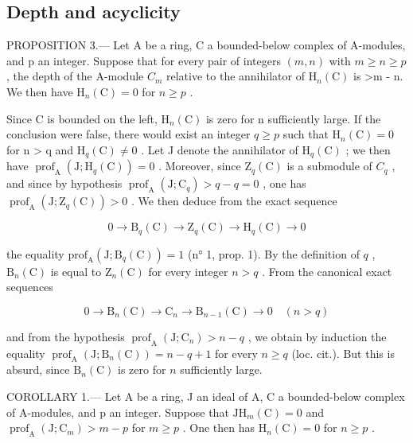 \subsection{Depth and acyclicity}

PROPOSITION 3.--- Let A be a ring, C a bounded-below complex of A-modules, and p an integer. Suppose that for every pair of integers \((m,n)\) with \(m \geqslant n \geqslant p\) , the depth of the A-module \(C_{m}\) relative to the annihilator of \(\mathrm{H}_{n}(\mathrm{C})\) is \textgreater m - n. We then have \(\mathrm{H}_{n}(\mathrm{C}) = 0\) for \(n \geqslant p\) .

Since C is bounded on the left, \(\mathrm{H}_{n}(\mathrm{C})\) is zero for n sufficiently large. If the conclusion were false, there would exist an integer \(q \geqslant p\) such that \(\mathrm{H}_{n}(\mathrm{C}) = 0\) for n \textgreater{} q and \(\mathrm{H}_{q}(\mathrm{C}) \neq 0\) . Let J denote the annihilator of \(\mathrm{H}_{q}(\mathrm{C})\) ; we then have \(\operatorname{prof}_{\mathrm{A}}(\mathrm{J}; \mathrm{H}_{q}(\mathrm{C})) = 0\) . Moreover, since \(\mathrm{Z}_{q}(\mathrm{C})\) is a submodule of \(C_{q}\) , and since by hypothesis \(\operatorname{prof}_{\mathrm{A}}(\mathrm{J}; \mathrm{C}_{q}) > q - q = 0\) , one has \(\operatorname{prof}_{\mathrm{A}}(\mathrm{J}; \mathrm{Z}_{q}(\mathrm{C})) > 0\) . We then deduce from the exact sequence

\[
0 \to \mathrm{B} _ {q} (\mathrm{C}) \to \mathrm{Z} _ {q} (\mathrm{C}) \to \mathrm{H} _ {q} (\mathrm{C}) \to 0
\]

the equality \(\mathrm{prof}_{\mathrm{A}}(\mathrm{J};\mathrm{B}_q(\mathrm{C})) = 1\) (n° 1, prop. 1). By the definition of \(q\) , \(\mathrm{B}_n(\mathrm{C})\) is equal to \(\mathrm{Z}_n(\mathrm{C})\) for every integer \(n > q\) . From the canonical exact sequences

\[
0 \to \mathrm{B} _ {n} (\mathrm{C}) \to \mathrm{C} _ {n} \to \mathrm{B} _ {n - 1} (\mathrm{C}) \to 0 \quad (n > q)
\]

and from the hypothesis \(\operatorname{prof}_{\mathrm{A}}(\mathrm{J};\mathrm{C}_{n}) > n - q\) , we obtain by induction the equality \(\operatorname{prof}_{\mathrm{A}}(\mathrm{J};\mathrm{B}_{n}(\mathrm{C})) = n - q + 1\) for every \(n \geqslant q\) (loc. cit.). But this is absurd, since \(\mathrm{B}_{n}(\mathrm{C})\) is zero for \(n\) sufficiently large.

COROLLARY 1.--- Let A be a ring, J an ideal of A, C a bounded-below complex of A-modules, and p an integer. Suppose that \(\mathrm{JH}_{m}(\mathrm{C}) = 0\) and \(\operatorname{prof}_{\mathrm{A}}(\mathrm{J}; \mathrm{C}_{m}) > m - p\) for \(m \geqslant p\) . One then has \(\mathrm{H}_{n}(\mathrm{C}) = 0\) for \(n \geqslant p\) .

